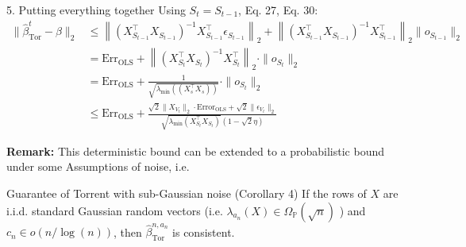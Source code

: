 \begin{frame}[shrink=7.5]
    \begin{block}{5. Putting everything together}
        Using $S_t = S_{t-1}$, Eq. 27, Eq. 30:
        \vspace{-0.4cm}
        \begin{align*}
        \|\hat{\beta}_{\text{Tor}}^t - \beta\|_2 &\leq \left\| (X_{S_{t-1}}^\top X_{S_{t-1}})^{-1} X_{S_{t-1}}^\top \epsilon_{S_{t-1}} \right\|_2 + \left\| (X_{S_{t-1}}^\top X_{S_{t-1}})^{-1} X_{S_{t-1}}^\top \right\|_2 \|o_{S_{t-1}}\|_2 \\
        &= \text{Err}_{\text{OLS}} + \left\| (X_{S_{t}}^\top X_{S_{t}})^{-1} X_{S_{t}}^\top \right\|_2 \cdot \|o_{S_{t}}\|_2 \\
        &= \text{Err}_{\text{OLS}} + \frac{1}{\sqrt{\lambda_{\min}((X_s^\top X_s))}} \cdot \|o_{S_{t}}\|_2 \\
        &\leq \text{Err}_{\text{OLS}} + \frac{\sqrt{2}\|X_{V_t}\|_2 \cdot \text{Error}_\text{OLS} + \sqrt{2}\|\epsilon_{V_t}\|_2}{\sqrt{\lambda_{\min}(X_{S_t}^\top X_{S_t})}(1 - \sqrt{2}\eta)}
        \end{align*}
    \end{block}
    \textbf{Remark:}
    This deterministic bound can be extended to a probabilistic bound under some Assumptions of noise, i.e. 
    \begin{exampleblock}{Guarantee of Torrent with sub-Gaussian noise (Corollary 4)}
        If the rows of $X$ are i.i.d. standard Gaussian random vectors (i.e. $\lambda_{a_n}(X) \in\Omega_{\mathbb{P}}(\sqrt{n})$ \cite{bhatia2015robustregressionhardthresholding}) and $c_n \in o(n/\log(n))$, then $\hat{\beta}_{\text{Tor}}^{n,a_n}$ is consistent.
    \end{exampleblock}
\end{frame}
